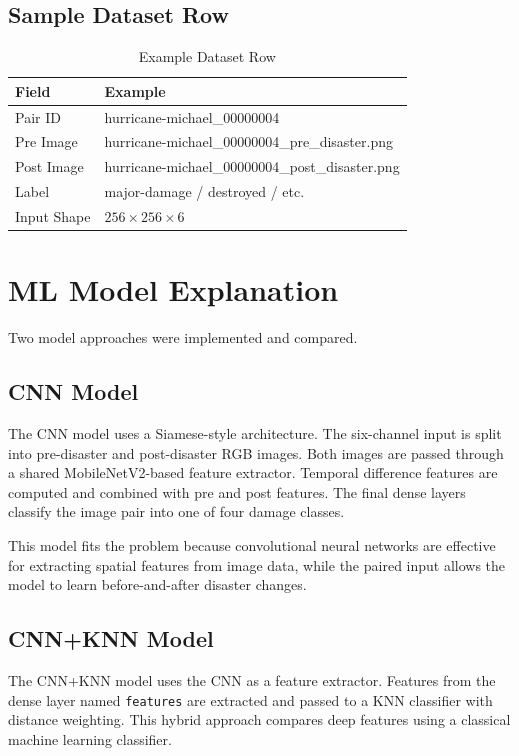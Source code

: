 \documentclass[conference]{IEEEtran}
\begin{document}
\subsection{Sample Dataset Row}
\begin{table}[h]
\centering
\caption{Example Dataset Row}
\label{tab:sample}
\begin{tabular}{p{2.4cm}p{5cm}}
\toprule
\textbf{Field} & \textbf{Example} \\
\midrule
Pair ID & hurricane-michael\_00000004 \\
Pre Image & hurricane-michael\_00000004\_pre\_disaster.png \\
Post Image & hurricane-michael\_00000004\_post\_disaster.png \\
Label & major-damage / destroyed / etc. \\
Input Shape & \(256 \times 256 \times 6\) \\
\bottomrule
\end{tabular}
\end{table}

\section{ML Model Explanation}
Two model approaches were implemented and compared.

\subsection{CNN Model}
The CNN model uses a Siamese-style architecture. The six-channel input is split into pre-disaster and post-disaster RGB images. Both images are passed through a shared MobileNetV2-based feature extractor. Temporal difference features are computed and combined with pre and post features. The final dense layers classify the image pair into one of four damage classes.

This model fits the problem because convolutional neural networks are effective for extracting spatial features from image data, while the paired input allows the model to learn before-and-after disaster changes.

\subsection{CNN+KNN Model}
The CNN+KNN model uses the CNN as a feature extractor. Features from the dense layer named \texttt{features} are extracted and passed to a KNN classifier with distance weighting. This hybrid approach compares deep features using a classical machine learning classifier.
\end{document}
